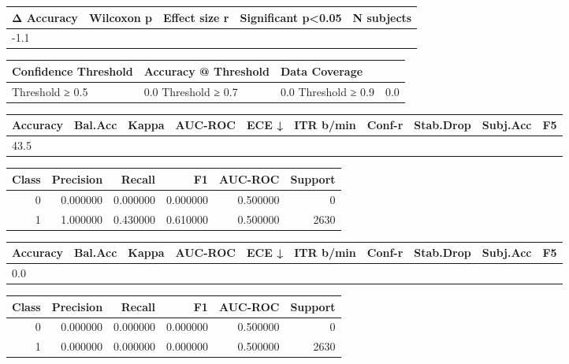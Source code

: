 \begin{tabular}{lrrll}
\toprule
Δ Accuracy & Wilcoxon p & Effect size r & Significant p<0.05 & N subjects \\
\midrule
-1.1%
\bottomrule
\end{tabular}


\begin{tabular}{lll}
\toprule
Confidence Threshold & Accuracy @ Threshold & Data Coverage \\
\midrule
Threshold ≥ 0.5 & 0.0%
Threshold ≥ 0.7 & 0.0%
Threshold ≥ 0.9 & 0.0%
\bottomrule
\end{tabular}


\begin{tabular}{llrrrrrlll}
\toprule
Accuracy & Bal.Acc & Kappa & AUC-ROC & ECE ↓ & ITR b/min & Conf-r & Stab.Drop & Subj.Acc & F5 \\
\midrule
43.5%
\bottomrule
\end{tabular}


\begin{tabular}{rrrrrr}
\toprule
Class & Precision & Recall & F1 & AUC-ROC & Support \\
\midrule
0 & 0.000000 & 0.000000 & 0.000000 & 0.500000 & 0 \\
1 & 1.000000 & 0.430000 & 0.610000 & 0.500000 & 2630 \\
\bottomrule
\end{tabular}


\begin{tabular}{llrrrrrlll}
\toprule
Accuracy & Bal.Acc & Kappa & AUC-ROC & ECE ↓ & ITR b/min & Conf-r & Stab.Drop & Subj.Acc & F5 \\
\midrule
0.0%
\bottomrule
\end{tabular}


\begin{tabular}{rrrrrr}
\toprule
Class & Precision & Recall & F1 & AUC-ROC & Support \\
\midrule
0 & 0.000000 & 0.000000 & 0.000000 & 0.500000 & 0 \\
1 & 0.000000 & 0.000000 & 0.000000 & 0.500000 & 2630 \\
\bottomrule
\end{tabular}


